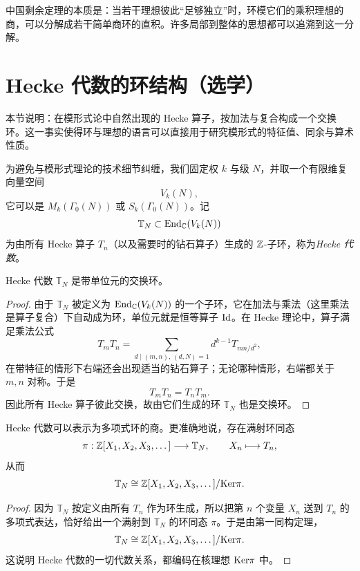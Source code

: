\begin{remark}
中国剩余定理的本质是：当若干理想彼此“足够独立”时，环模它们的乘积理想的商，可以分解成若干简单商环的直积。许多局部到整体的思想都可以追溯到这一分解。
\end{remark}

\section{Hecke 代数的环结构（选学）}

本节说明：在模形式论中自然出现的 Hecke 算子，按加法与复合构成一个交换环。这一事实使得环与理想的语言可以直接用于研究模形式的特征值、同余与算术性质。

为避免与模形式理论的技术细节纠缠，我们固定权 $k$ 与级 $N$，并取一个有限维复向量空间
\[
V_k(N),
\]
它可以是 $M_k(\Gamma_0(N))$ 或 $S_k(\Gamma_0(N))$。记
\[
\mathbb{T}_N\subset \mathrm{End}_{\mathbb{C}}(V_k(N))
\]
为由所有 Hecke 算子 $T_n$（以及需要时的钻石算子）生成的 $\mathbb{Z}$-子环，称为\emph{Hecke 代数}。

\begin{proposition}
Hecke 代数 $\mathbb{T}_N$ 是带单位元的交换环。
\end{proposition}

\begin{proof}
由于 $\mathbb{T}_N$ 被定义为 $\mathrm{End}_{\mathbb{C}}(V_k(N))$ 的一个子环，它在加法与乘法（这里乘法是算子复合）下自动成为环，单位元就是恒等算子 $\mathrm{Id}$。在 Hecke 理论中，算子满足乘法公式
\[
T_mT_n=\sum_{d\mid (m,n),\,(d,N)=1} d^{k-1}T_{mn/d^2},
\]
在带特征的情形下右端还会出现适当的钻石算子；无论哪种情形，右端都关于 $m,n$ 对称。于是
\[
T_mT_n=T_nT_m.
\]
因此所有 Hecke 算子彼此交换，故由它们生成的环 $\mathbb{T}_N$ 也是交换环。
\end{proof}

\begin{proposition}
Hecke 代数可以表示为多项式环的商。更准确地说，存在满射环同态
\[
\pi:\mathbb{Z}[X_1,X_2,X_3,\dots]\longrightarrow \mathbb{T}_N,
\qquad X_n\longmapsto T_n,
\]
从而
\[
\mathbb{T}_N\cong \mathbb{Z}[X_1,X_2,X_3,\dots]/\mathrm{Ker}\pi.
\]
\end{proposition}

\begin{proof}
因为 $\mathbb{T}_N$ 按定义由所有 $T_n$ 作为环生成，所以把第 $n$ 个变量 $X_n$ 送到 $T_n$ 的多项式表达，恰好给出一个满射到 $\mathbb{T}_N$ 的环同态 $\pi$。于是由第一同构定理，
\[
\mathbb{T}_N\cong \mathbb{Z}[X_1,X_2,X_3,\dots]/\mathrm{Ker}\pi.
\]
这说明 Hecke 代数的一切代数关系，都编码在核理想 $\mathrm{Ker}\pi$ 中。
\end{proof}

